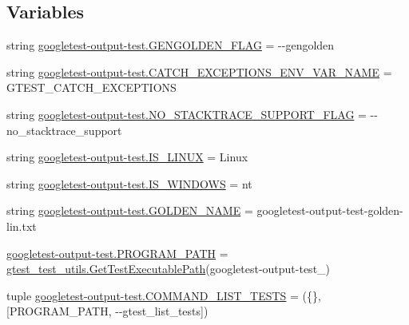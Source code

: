\subsection*{Variables}
\begin{DoxyCompactItemize}
\item 
string \mbox{\hyperlink{namespacegoogletest-output-test_ad0d41196cc1dba894e54cd7129b5fc0a}{googletest-\/output-\/test.\+G\+E\+N\+G\+O\+L\+D\+E\+N\+\_\+\+F\+L\+AG}} = \textquotesingle{}-\/-\/gengolden\textquotesingle{}
\item 
string \mbox{\hyperlink{namespacegoogletest-output-test_ae6116e1d24bc75b7559e53353b8ee91c}{googletest-\/output-\/test.\+C\+A\+T\+C\+H\+\_\+\+E\+X\+C\+E\+P\+T\+I\+O\+N\+S\+\_\+\+E\+N\+V\+\_\+\+V\+A\+R\+\_\+\+N\+A\+ME}} = \textquotesingle{}G\+T\+E\+S\+T\+\_\+\+C\+A\+T\+C\+H\+\_\+\+E\+X\+C\+E\+P\+T\+I\+O\+NS\textquotesingle{}
\item 
string \mbox{\hyperlink{namespacegoogletest-output-test_aa5200b284ce09415c0061e96811cf24c}{googletest-\/output-\/test.\+N\+O\+\_\+\+S\+T\+A\+C\+K\+T\+R\+A\+C\+E\+\_\+\+S\+U\+P\+P\+O\+R\+T\+\_\+\+F\+L\+AG}} = \textquotesingle{}-\/-\/no\+\_\+stacktrace\+\_\+support\textquotesingle{}
\item 
string \mbox{\hyperlink{namespacegoogletest-output-test_a7ff614069cc92eea5943d720b479afd7}{googletest-\/output-\/test.\+I\+S\+\_\+\+L\+I\+N\+UX}} = \textquotesingle{}Linux\textquotesingle{}
\item 
string \mbox{\hyperlink{namespacegoogletest-output-test_a88183ad6c50d9f025ab11d07e5b4d9ec}{googletest-\/output-\/test.\+I\+S\+\_\+\+W\+I\+N\+D\+O\+WS}} = \textquotesingle{}nt\textquotesingle{}
\item 
string \mbox{\hyperlink{namespacegoogletest-output-test_a66b45fb215424c968b479fbf864f1e7f}{googletest-\/output-\/test.\+G\+O\+L\+D\+E\+N\+\_\+\+N\+A\+ME}} = \textquotesingle{}googletest-\/output-\/test-\/golden-\/lin.\+txt\textquotesingle{}
\item 
\mbox{\hyperlink{namespacegoogletest-output-test_a36302384d49a636defe86704a422acb2}{googletest-\/output-\/test.\+P\+R\+O\+G\+R\+A\+M\+\_\+\+P\+A\+TH}} = \mbox{\hyperlink{namespacegtest__test__utils_a89ed3717984a80ffbb7a9c92f71b86a2}{gtest\+\_\+test\+\_\+utils.\+Get\+Test\+Executable\+Path}}(\textquotesingle{}googletest-\/output-\/test\+\_\+\textquotesingle{})
\item 
tuple \mbox{\hyperlink{namespacegoogletest-output-test_accb05a0a5c9b083723186bb6116f928f}{googletest-\/output-\/test.\+C\+O\+M\+M\+A\+N\+D\+\_\+\+L\+I\+S\+T\+\_\+\+T\+E\+S\+TS}} = (\{\}, \mbox{[}P\+R\+O\+G\+R\+A\+M\+\_\+\+P\+A\+TH, \textquotesingle{}-\/-\/gtest\+\_\+list\+\_\+tests\textquotesingle{}\mbox{]})

\end{DoxyCompactItemize}
